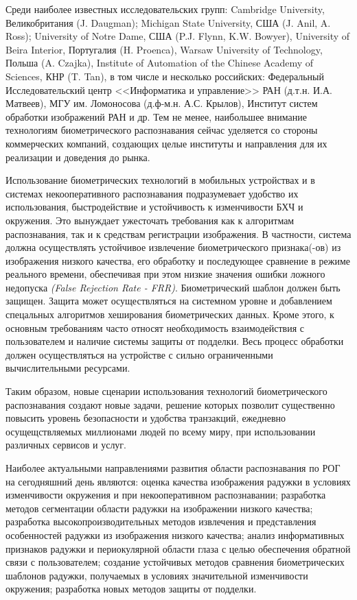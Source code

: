 {Среди наиболее известных исследовательских групп: Cambridge University, Великобритания (J. Daugman); Michigan State University, США (J. Anil, A. Ross); University of Notre Dame, США (P.J. Flynn, K.W. Bowyer), University of Beira Interior, Португалия (H. Proenca), Warsaw University of Technology, Польша (A. Czajka), Institute of Automation of the Chinese Academy of Sciences, КНР (T. Tan), в том числе и несколько российских: Федеральный Исследовательский центр <<Информатика и управление>> РАН (д.т.н. И.А. Матвеев), МГУ им. Ломоносова (д.ф-м.н. А.С. Крылов), Институт систем обработки изображений РАН и др. Тем не менее, наибольшее внимание технологиям биометрического распознавания сейчас уделяется со стороны коммерческих компаний, создающих целые институты и направления для их реализации и доведения до рынка.

Использование биометрических технологий в мобильных устройствах и в системах некооперативного распознавания подразумевает удобство их использования, быстродействие и устойчивость к изменчивости БХЧ и окружения. Это вынуждает ужесточать требования как к алгоритмам распознавания, так и к средствам регистрации изображения. В частности, система должна осуществлять устойчивое извлечение биометрического признака(-ов) из изображения низкого качества, его обработку и последующее сравнение в режиме реального времени, обеспечивая при этом низкие значения ошибки ложного недопуска \textit{(False Rejection Rate - FRR)}. Биометрический шаблон должен быть защищен. Защита может осуществляться на системном уровне и добавлением спецальных алгоритмов хеширования биометрических данных. Кроме этого, к основным требованиям часто относят необходимость взаимодействия с пользователем и наличие системы защиты от подделки. Весь процесс обработки должен осуществляться на устройстве с сильно ограниченными вычислительными ресурсами.

Таким образом, новые сценарии использования технологий биометрического распознавания создают новые задачи, решение которых позволит существенно повысить уровень безопасности и удобства транзакций, ежедневно осущещствляемых миллионами людей по всему миру, при использовании различных сервисов и услуг.

Наиболее актуальными направлениями развития области распознавания по РОГ на сегодняшний день являются: оценка качества изображения радужки в условиях изменчивости окружения и при некооперативном распознавании; разработка методов сегментации области радужки на изображении низкого качества; разработка высокопроизводительных методов извлечения и представления особенностей радужки из изображения низкого качества; анализ информативных признаков радужки и периокулярной области глаза с целью обеспечения обратной связи с пользователем; создание устойчивых методов сравнения биометрических шаблонов радужки, получаемых в условиях значительной изменчивости окружения; разработка новых методов защиты от подделки.
}


